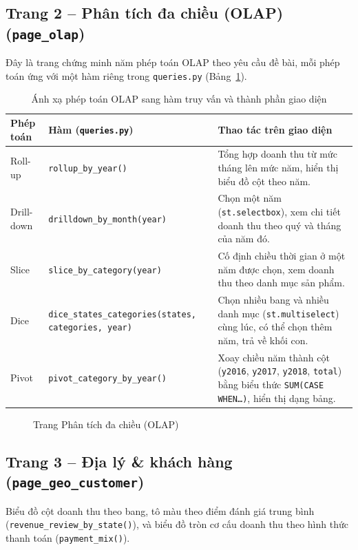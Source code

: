 \documentclass[12pt,a4paper]{article}
\newcommand{\code}[1]{\texttt{\small #1}}
\begin{document}
\subsection{Trang 2 -- Phân tích đa chiều (OLAP) (\code{page\_olap})}
Đây là trang chứng minh năm phép toán OLAP theo yêu cầu đề bài, mỗi phép toán ứng với một hàm riêng trong
\code{queries.py} (Bảng~\ref{tab:olap-map}).

\begin{table}[h]
\centering
\caption{Ánh xạ phép toán OLAP sang hàm truy vấn và thành phần giao diện}\label{tab:olap-map}
\small
\begin{tabularx}{\textwidth}{@{}l l X@{}}
\toprule
\textbf{Phép toán} & \textbf{Hàm (\code{queries.py})} & \textbf{Thao tác trên giao diện}\\
\midrule
Roll-up & \code{rollup\_by\_year()} & Tổng hợp doanh thu từ mức tháng lên mức năm, hiển thị biểu đồ cột theo năm.\\
Drill-down & \code{drilldown\_by\_month(year)} & Chọn một năm (\code{st.selectbox}), xem chi tiết doanh thu theo quý và tháng của năm đó.\\
Slice & \code{slice\_by\_category(year)} & Cố định chiều thời gian ở một năm được chọn, xem doanh thu theo danh mục sản phẩm.\\
Dice & \code{dice\_states\_categories(states, categories, year)} & Chọn nhiều bang và nhiều danh mục (\code{st.multiselect}) cùng lúc, có thể chọn thêm năm, trả về khối con.\\
Pivot & \code{pivot\_category\_by\_year()} & Xoay chiều năm thành cột (\code{y2016}, \code{y2017}, \code{y2018}, \code{total}) bằng biểu thức \code{SUM(CASE WHEN\ldots)}, hiển thị dạng bảng.\\
\bottomrule
\end{tabularx}
\end{table}

\begin{figure}[h]
\centering
{}
\caption{Trang Phân tích đa chiều (OLAP)}\label{fig:ss-olap}
\end{figure}

\subsection{Trang 3 -- Địa lý \& khách hàng (\code{page\_geo\_customer})}
Biểu đồ cột doanh thu theo bang, tô màu theo điểm đánh giá trung bình (\code{revenue\_review\_by\_state()}),
và biểu đồ tròn cơ cấu doanh thu theo hình thức thanh toán (\code{payment\_mix()}).
\end{document}

